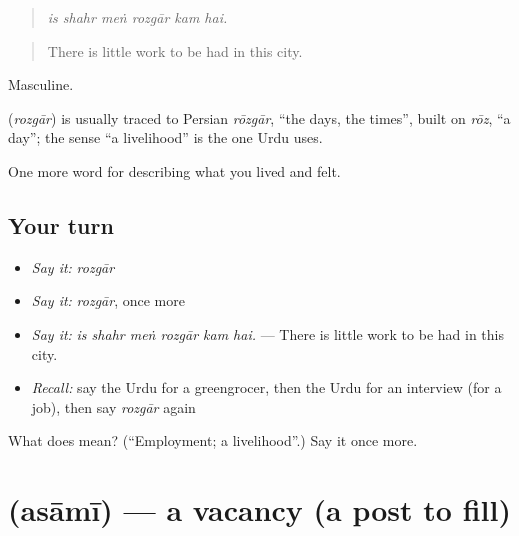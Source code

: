 \begin{quote}
     
\end{quote}

\begin{quote}
\emph{is shahr meṅ rozgār kam hai.}
\end{quote}

\begin{quote}
There is little work to be had in this city.
\end{quote}

Masculine.

\begin{cousinweb}
\textbf{} (\emph{rozgār}) is usually traced to Persian \emph{rōzgār}, \textquotedblleft{}the days, the times\textquotedblright{}, built on \emph{rōz}, \textquotedblleft{}a day\textquotedblright{}; the sense \textquotedblleft{}a livelihood\textquotedblright{} is the one Urdu uses.
\end{cousinweb}

\begin{grammarlens}[title={What you've built}]
One more word for describing what you lived and felt.
\end{grammarlens}

\subsection*{Your turn}
\begin{itemize}
\raggedright
  \item \emph{Say it:} \emph{rozgār}
  \item \emph{Say it:} \emph{rozgār}, once more
  \item \emph{Say it:} \emph{is shahr meṅ rozgār kam hai.} — There is little work to be had in this city.
  \item \emph{Recall:} say the Urdu for a greengrocer, then the Urdu for an interview (for a job), then say \emph{rozgār} again
\end{itemize}

\begin{tcolorbox}[breakable,colback=teal!4,colframe=teal!35!black,title={Before you move on}]
What does  mean? (\textquotedblleft{}Employment; a livelihood\textquotedblright{}.) Say it once more.
\end{tcolorbox}
\section[\texorpdfstring{\ur{اسامی} (asāmī)}{اسامی (asāmī)}]{ (asāmī) — a vacancy (a post to fill)}

